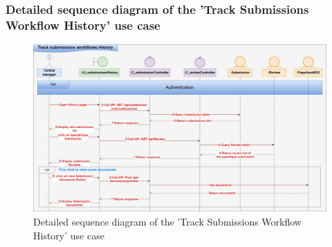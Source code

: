 \subsubsection{Detailed sequence diagram of the 'Track Submissions Workflow History' use case}
\begin{figure}[h!]
    \centering
    \includegraphics[width=1\textwidth]{figures/det track sub workflow history.png}
    \caption{Detailed sequence diagram of the 'Track Submissions Workflow History' use case}
\end{figure}
\clearpage


